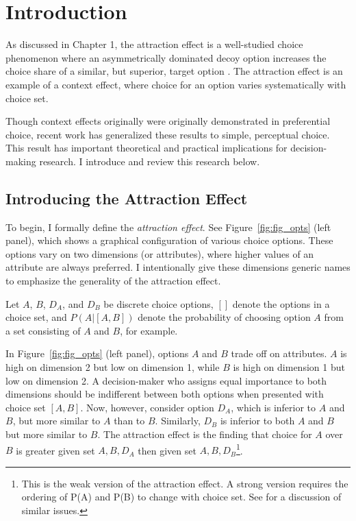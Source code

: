 \section{Introduction}
As discussed in Chapter 1, the attraction effect is a well-studied choice phenomenon where an asymmetrically dominated decoy option increases the choice share of a similar, but superior, target option \parencite{huberAddingAsymmetricallyDominated1982d}. The attraction effect is an example of a context effect, where choice for an option varies systematically with choice set.

Though context effects originally were originally demonstrated in preferential choice, recent work has generalized these results to simple, perceptual choice. This result has important theoretical and practical implications for decision-making research. I introduce and review this research below.

\subsection{Introducing the Attraction Effect}

To begin, I formally define the \textit{attraction effect}. See Figure~\ref{fig:fig_opts} (left panel), which shows a graphical configuration of various choice options. These options vary on two dimensions (or attributes), where higher values of an attribute are always preferred. I intentionally give these dimensions generic names to emphasize the generality of the attraction effect.

Let $A$, $B$, $D_{A}$, and $D_{B}$ be discrete choice options, $[]$ denote the options in a choice set, and $P(A|[A,B])$ denote the probability of choosing option $A$ from a set consisting of $A$ and $B$, for example. 

In Figure~\ref{fig:fig_opts} (left panel), options $A$ and $B$ trade off on attributes. $A$ is high on dimension 2 but low on dimension 1, while $B$ is high on dimension 1 but low on dimension 2. A decision-maker who assigns equal importance to both dimensions should be indifferent between both options when presented with choice set $[A,B]$. Now, however, consider option $D_{A}$, which is inferior to $A$ and $B$, but more similar to $A$ than to $B$. Similarly, $D_{B}$ is inferior to both $A$ and $B$ but more similar to $B$. The attraction effect is the finding that choice for $A$ over $B$ is greater given set ${A,B,D_{A}}$ then given set $A,B,D_{B}$\footnote{This is the weak version of the attraction effect. A strong version requires the ordering of P(A) and P(B) to change with choice set. See \textcite{davis2023illustrated} for a discussion of similar issues.}. 

